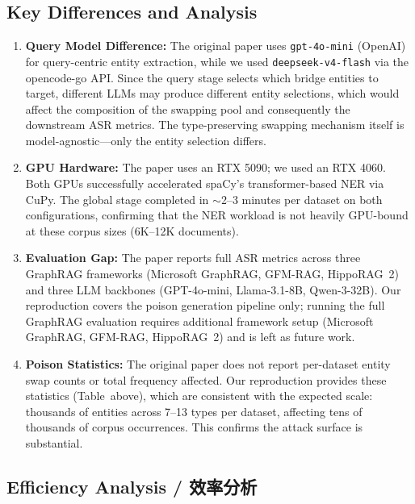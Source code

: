 \documentclass[11pt,a4paper]{article}
\begin{document}
\subsection{Key Differences and Analysis}

\begin{enumerate}
  \item \textbf{Query Model Difference:}
    The original paper uses \texttt{gpt-4o-mini} (OpenAI) for query-centric entity
    extraction, while we used \texttt{deepseek-v4-flash} via the opencode-go API.
    Since the query stage selects which bridge entities to target, different LLMs
    may produce different entity selections, which would affect the composition of
    the swapping pool and consequently the downstream ASR metrics.  The type-preserving
    swapping mechanism itself is model-agnostic---only the entity selection differs.

  \item \textbf{GPU Hardware:}
    The paper uses an RTX 5090; we used an RTX 4060.  Both GPUs successfully
    accelerated spaCy's transformer-based NER via CuPy.  The global stage completed
    in $\sim$2--3 minutes per dataset on both configurations, confirming that the
    NER workload is not heavily GPU-bound at these corpus sizes (6K--12K documents).

  \item \textbf{Evaluation Gap:}
    The paper reports full ASR metrics across three GraphRAG frameworks
    (Microsoft GraphRAG, GFM-RAG, HippoRAG~2) and three LLM backbones
    (GPT-4o-mini, Llama-3.1-8B, Qwen-3-32B).  Our reproduction covers the
    poison generation pipeline only; running the full GraphRAG evaluation
    requires additional framework setup (Microsoft GraphRAG, GFM-RAG,
    HippoRAG~2) and is left as future work.

  \item \textbf{Poison Statistics:}
    The original paper does not report per-dataset entity swap counts or total
    frequency affected.  Our reproduction provides these statistics
    (Table~above), which are consistent with the expected scale: thousands of
    entities across 7--13 types per dataset, affecting tens of thousands of
    corpus occurrences.  This confirms the attack surface is substantial.
\end{enumerate}

\subsection{Efficiency Analysis / 效率分析}
\end{document}
